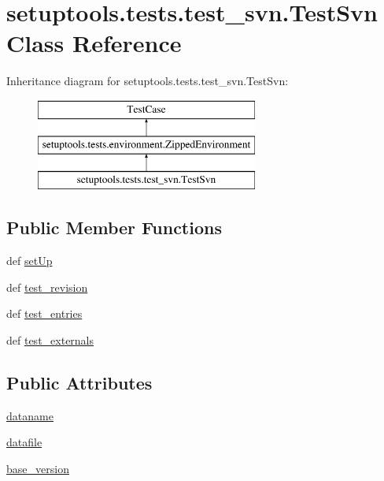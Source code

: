 \hypertarget{classsetuptools_1_1tests_1_1test__svn_1_1TestSvn}{}\section{setuptools.\+tests.\+test\+\_\+svn.\+Test\+Svn Class Reference}
\label{classsetuptools_1_1tests_1_1test__svn_1_1TestSvn}
Inheritance diagram for setuptools.\+tests.\+test\+\_\+svn.\+Test\+Svn\+:\begin{figure}[H]
\begin{center}
\leavevmode
\includegraphics[height=3.000000cm]{classsetuptools_1_1tests_1_1test__svn_1_1TestSvn}
\end{center}
\end{figure}
\subsection*{Public Member Functions}
\begin{DoxyCompactItemize}
\item 
def \hyperlink{classsetuptools_1_1tests_1_1test__svn_1_1TestSvn_a146c68ab33aa616a621b09c416962368}{set\+Up}
\item 
def \hyperlink{classsetuptools_1_1tests_1_1test__svn_1_1TestSvn_a6549d67294f67898f1712f8983839b2a}{test\+\_\+revision}
\item 
def \hyperlink{classsetuptools_1_1tests_1_1test__svn_1_1TestSvn_a542f15a0f0a7e61f7ee6ed523007c3d7}{test\+\_\+entries}
\item 
def \hyperlink{classsetuptools_1_1tests_1_1test__svn_1_1TestSvn_ae04e8480b763638a7794d75e3cf6751f}{test\+\_\+externals}
\end{DoxyCompactItemize}
\subsection*{Public Attributes}
\begin{DoxyCompactItemize}
\item 
\hyperlink{classsetuptools_1_1tests_1_1test__svn_1_1TestSvn_ae6afadcc81dbe4f2500dbace941730a5}{dataname}
\item 
\hyperlink{classsetuptools_1_1tests_1_1test__svn_1_1TestSvn_add050937bc63ee49a14999b44bf2e44a}{datafile}
\item 
\hyperlink{classsetuptools_1_1tests_1_1test__svn_1_1TestSvn_a9a9f4f5d0c2304feeee6ea8a020397e7}{base\+\_\+version}
\end{DoxyCompactItemize}
